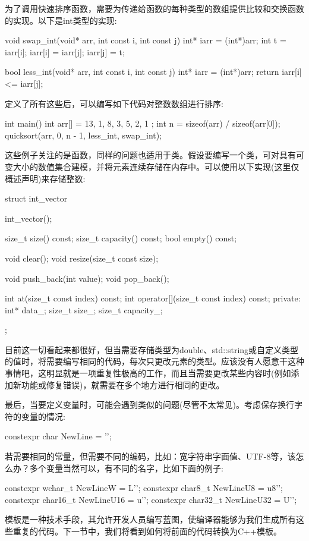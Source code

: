 为了调用快速排序函数，需要为传递给函数的每种类型的数组提供比较和交换函数的实现。以下是int类型的实现:

\begin{cpp}
void swap_int(void* arr, int const i, int const j)
{
	int* iarr = (int*)arr;
	int t = iarr[i];
	iarr[i] = iarr[j];
	iarr[j] = t;
}

bool less_int(void* arr, int const i, int const j)
{
	int* iarr = (int*)arr;
	return iarr[i] <= iarr[j];
}
\end{cpp}

定义了所有这些后，可以编写如下代码对整数数组进行排序:

\begin{cpp}
int main()
{
	int arr[] = { 13, 1, 8, 3, 5, 2, 1 };
	int n = sizeof(arr) / sizeof(arr[0]);
	quicksort(arr, 0, n - 1, less_int, swap_int);
}
\end{cpp}

这些例子关注的是函数，同样的问题也适用于类。假设要编写一个类，可对具有可变大小的数值集合建模，并将元素连续存储在内存中。可以使用以下实现(这里仅概述声明)来存储整数:

\begin{cpp}
struct int_vector
{
	int_vector();
	
	size_t size() const;
	size_t capacity() const;
	bool empty() const;
	
	void clear();
	void resize(size_t const size);
	
	void push_back(int value);
	void pop_back();
	
	int at(size_t const index) const;
	int operator[](size_t const index) const;
private:
	int* data_;
	size_t size_;
	size_t capacity_;
};
\end{cpp}

目前这一切看起来都很好，但当需要存储类型为double、std::string或自定义类型的值时，将需要编写相同的代码，每次只更改元素的类型。应该没有人愿意干这种事情吧，这明显就是一项重复性极高的工作，而且当需要更改某些内容时(例如添加新功能或修复错误)，就需要在多个地方进行相同的更改。

最后，当要定义变量时，可能会遇到类似的问题(尽管不太常见)。考虑保存换行字符的变量的情况:

\begin{cpp}
constexpr char NewLine = '\n';
\end{cpp}

若需要相同的常量，但需要不同的编码，比如：宽字符串字面值、UTF-8等，该怎么办？多个变量当然可以，有不同的名字，比如下面的例子:

\begin{cpp}
constexpr wchar_t NewLineW = L'\n';
constexpr char8_t NewLineU8 = u8'\n';
constexpr char16_t NewLineU16 = u'\n';
constexpr char32_t NewLineU32 = U'\n';
\end{cpp}

模板是一种技术手段，其允许开发人员编写蓝图，使编译器能够为我们生成所有这些重复的代码。下一节中，我们将看到如何将前面的代码转换为C++模板。







